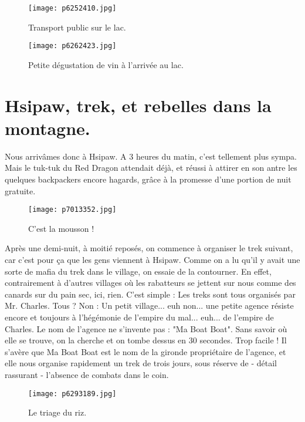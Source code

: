 \documentclass{book}
\begin{document}
\begin{figure}[h]
\centering
\texttt{[image: p6252410.jpg]}
\caption*{Transport public sur le lac.}
\end{figure}


\begin{figure}[h]
\centering
\texttt{[image: p6262423.jpg]}
\caption*{Petite dégustation de vin à l'arrivée au lac.}
\end{figure}




\chapter{Hsipaw, trek, et rebelles dans la montagne.}
Nous arrivâmes donc à Hsipaw. A 3 heures du matin, c'est tellement plus sympa. Mais le tuk-tuk du Red Dragon attendait déjà, et réussi à attirer en son antre les quelques backpackers encore hagards, grâce à la promesse d'une portion de nuit gratuite.


\begin{figure}[h]
\centering
\texttt{[image: p7013352.jpg]}
\caption*{C'est la mousson !}
\end{figure}

Après une demi-nuit, à moitié reposés, on commence à organiser le trek suivant, car c'est pour ça que les gens viennent à Hsipaw. Comme on a lu qu'il y avait une sorte de mafia du trek dans le village, on essaie de la contourner. En effet, contrairement à d'autres villages où les rabatteurs se jettent sur nous comme des canards sur du pain sec, ici, rien. C'est simple : Les treks sont tous organisés par Mr. Charles. Tous ? Non : Un petit village... euh non... une petite agence résiste encore et toujours à l'hégémonie de l'empire du mal... euh... de l'empire de Charles. Le nom de l'agence ne s'invente pas : "Ma Boat Boat". Sans savoir où elle se trouve, on la cherche et on tombe dessus en 30 secondes. Trop facile ! Il s'avère que Ma Boat Boat est le nom de la gironde propriétaire de l'agence, et elle nous organise rapidement un trek de trois jours, sous réserve de - détail rassurant - l'absence de combats dans le coin.


\begin{figure}[h]
\centering
\texttt{[image: p6293189.jpg]}
\caption*{Le triage du riz.}
\end{figure}
\end{document}
